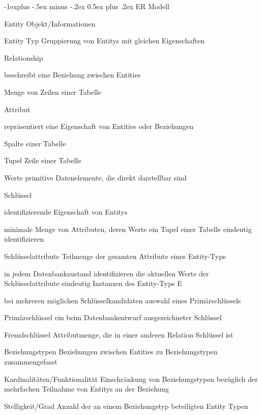 \documentclass[a4paper]{article}
\makeatletter
\renewcommand{\subsection}{\@startsection{subsection}{2}{0mm}%
                                {-1explus -.5ex minus -.2ex}%
                                {0.5ex plus .2ex}%
                                {\normalfont\normalsize\bfseries}}
\makeatother
\begin{document}
\begin{multicols}{3}
    \subsection{ER Modell}
    \begin{description*}
        \item[Entity] Objekt/Informationen
        \item[Entity Typ] Gruppierung von Entitys mit gleichen Eigenschaften
        \item[Relationship]
        \begin{itemize*}
            \item beschreibt eine Beziehung zwischen Entities
            \item Menge von Zeilen einer Tabelle
        \end{itemize*}
        \item[Attribut]
        \begin{itemize*}
            \item repräsentiert eine Eigenschaft von Entities oder Beziehungen
            \item Spalte einer Tabelle
        \end{itemize*}
        \item[Tupel] Zeile einer Tabelle
        \item[Werte] primitive Datenelemente, die direkt darstellbar sind
        \item[Schlüssel] 
        \begin{itemize*}
            \item identifizierende Eigenschaft von Entitys
            \item minimale Menge von Attributen, deren Werte ein Tupel einer Tabelle eindeutig identifizieren
        \end{itemize*}
        \item[Schlüsselattribute] Teilmenge der gesamten Attribute eines Entity-Typs
        \begin{itemize*}
            \item in jedem Datenbankzustand identifizieren die aktuellen Werte der Schlüsselattribute eindeutig Instanzen des Entity-Typs E
            \item bei mehreren möglichen Schlüsselkandidaten auswahl eines Primärschlüssels
        \end{itemize*}
        \item[Primärschlüssel] ein beim Datenbankentwurf ausgezeichneter Schlüssel
        \item[Fremdschlüssel] Attributmenge, die in einer anderen Relation Schlüssel ist
        \item[Beziehungstypen] Beziehungen zwischen Entities zu Beziehungstypen zusammengefasst
        \item[Kardinalitäten/Funktionalität] Einschränkung von Beziehungstypen bezüglich der mehrfachen Teilnahme von Entitys an der Beziehung
        \item[Stelligkeit/Grad] Anzahl der an einem Beziehungstyp beteiligten Entity Typen
    \end{description*}


\end{multicols}
\end{document}
